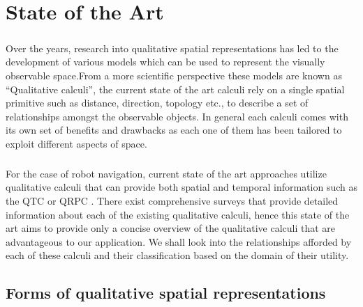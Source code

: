 
\chapter{State of the Art}
\paragraph{}Over the years, research into qualitative spatial representations has led to the development of various models which can be used to represent the visually observable space.From a more scientific perspective these models are known as ``Qualitative calculi'', the current state of the art calculi rely on a single spatial primitive such as distance, direction, topology etc., to describe a set of relationships amongst the observable objects. In general each calculi comes with its own set of benefits and drawbacks as each one of them has been tailored to exploit different aspects of space\cite{bibid}. 

\paragraph{}For the case of robot navigation, current state of the art approaches utilize qualitative calculi that can provide both spatial and temporal information such as the QTC \cite{bibid} or QRPC \cite{bibid}. There exist comprehensive surveys that provide detailed information about each of the existing qualitative calculi\cite{bibid}, hence this state of the art aims to provide only a concise overview of the qualitative calculi that are advantageous to our application. We shall look into the relationships afforded by each of these calculi and their classification based on the domain of their utility.
 
\section{Forms of qualitative spatial representations}
		
